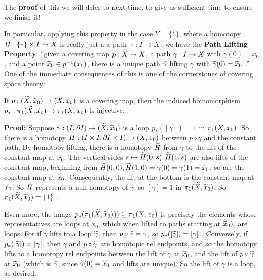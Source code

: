 The {\bf proof} of this we will defer to next time, to give us sufficient time to ensure we
finish it!

\msk

 In particular, applying this property in the case $Y=\{*\}$, where a homotopy
$H:\{*\}\times I\rightarrow X$ is really just a a path $\gamma:I\rightarrow X$,
we have the {\bf Path Lifting Property}: ``given 
a covering map $p:\widetilde{X}\rightarrow X$, a path 
$\gamma:I\rightarrow X$ with $\gamma(0)=x_0$, and a point 
$\widetilde{x}_0\in p^{-1}(x_0)$, there is a unique path $\widetilde{\gamma}$
lifting $\gamma$ with $\widetilde{\gamma}(0)=\widetilde{x}_0$ .'' One of the 
immediate consequences of this is one of the cornerstones of covering space
theory:

\bsk  

If $p:(\widetilde{X},\tilde{x}_0)\rightarrow (X,x_0)$ is a covering map, then the 
induced homomorphism $p_*:\pi_1(\widetilde{X},\widetilde{x}_0)\rightarrow \pi_1(X,x_0)$ is
injective.

\msk

{\bf Proof:} Suppose $\gamma:(I,\partial I)\rightarrow (\widetilde{X},\widetilde{x}_0)$ is a 
loop $p_*([\gamma])=1$ in $\pi_1(X,x_0)$. So there is a homotopy
$H:(I\times I,\partial I\times I)\rightarrow (X,x_0)$ between $p\circ\gamma$ and the constant 
path. By homotopy lifting, there is a homotopy $\widetilde{H}$ from $\gamma$ to 
the lift of the constant map at $x_0$. The vertical sides 
$s\mapsto \widetilde{H}(0,s),\widetilde{H}(1,s)$ are also lifts of the 
constant map, beginning from 
$\widetilde{H}(0,0),\widetilde{H}(1,0)=\gamma(0)=\gamma(1)=\widetilde{x}_0$, so
are the constant map at $\widetilde{x}_0$. Consequently, the lift at the 
bottom is the constant map at $\widetilde{x}_0$. So $\widetilde{H}$
represents a null-homotopy of $\gamma$, so $[\gamma]=1$
in $\pi_1(\widetilde{X},\widetilde{x}_0)$. So $\pi_1(\widetilde{X},\widetilde{x}_0)=\{1\}$ .

\msk

Even more, the image $p_*(\pi_1(\widetilde{X},\widetilde{x}_0)))\subseteq \pi_1(X,x_0)$
is precisely the elements whose representatives are loops at $x_0$, 
which when
lifted to paths starting at $\widetilde{x}_0)$, are loops. 
For if $\gamma$ lifts
to a loop $\widetilde{\gamma}$, then $p\circ\widetilde{\gamma}=\gamma$, so
$p_*([\widetilde{\gamma}])=[\gamma]$ . Conversely, if 
$p_*([\widetilde{\gamma}])=[\gamma]$, then $\gamma$ and $p\circ\widetilde{\gamma}$
are homotopic rel endpoints, and so the homotopy lifts to 
a homotopy rel endpoints between the lift of $\gamma$ at 
$\widetilde{x}_0$, and the lift of $p\circ\widetilde{\gamma}$ at $\widetilde{x}_0$
(which is $\widetilde{\gamma}$, since $\widetilde{\gamma}(0)=\widetilde{x}_0$ and
lifts are unique). So the lift of $\gamma$ is a loop, as desired.

